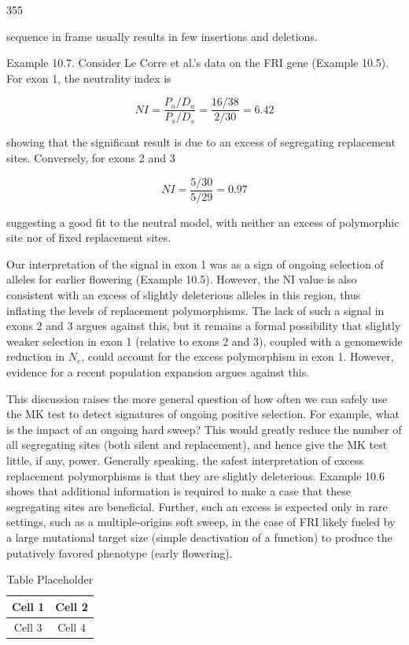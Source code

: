 \documentclass{article}
\begin{document}
355

sequence in frame usually results in few insertions and deletions.

Example 10.7. Consider Le Corre et al.'s data on the FRI gene (Example 10.5). For exon 1, the neutrality index is

\begin{equation}
NI=\frac{P_{a}/D_{a}}{P_{s}/D_{s}}=\frac{16/38}{2/30}=6.42
\end{equation}

showing that the significant result is due to an excess of segregating replacement sites. Conversely, for exons 2 and 3

\begin{equation}
NI=\frac{5/30}{5/29}=0.97
\end{equation}

suggesting a good fit to the neutral model, with neither an excess of polymorphic site nor of fixed replacement sites.

Our interpretation of the signal in exon 1 was as a sign of ongoing selection of alleles for earlier flowering (Example 10.5). However, the NI value is also consistent with an excess of slightly deleterious alleles in this region, thus inflating the levels of replacement polymorphisms. The lack of such a signal in exons 2 and 3 argues against this, but it remains a formal possibility that slightly weaker selection in exon 1 (relative to exons 2 and 3), coupled with a genomewide reduction in  $ N_{e} $, could account for the excess polymorphism in exon 1. However, evidence for a recent population expansion argues against this.

This discussion raises the more general question of how often we can safely use the MK test to detect signatures of ongoing positive selection. For example, what is the impact of an ongoing hard sweep? This would greatly reduce the number of all segregating sites (both silent and replacement), and hence give the MK test little, if any, power. Generally speaking, the safest interpretation of excess replacement polymorphisms is that they are slightly deleterious. Example 10.6 shows that additional information is required to make a case that these segregating sites are beneficial. Further, such an excess is expected only in rare settings, such as a multiple-origins soft sweep, in the case of FRI likely fueled by a large mutational target size (simple deactivation of a function) to produce the putatively favored phenotype (early flowering).

\begin{table}[h]
\centering
\begin{tabular}{|c|c|}
\hline
Cell 1 & Cell 2 \\
\hline
Cell 3 & Cell 4 \\
\hline
\end{tabular}
\caption{Table Placeholder}
\end{table}
\end{document}
